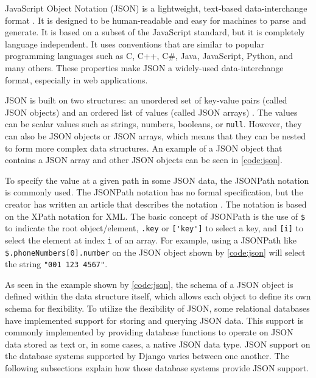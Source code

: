 JavaScript Object Notation (JSON) is a lightweight, text-based data-interchange
format \cite{json}. It is designed to be human-readable and easy for machines
to parse and generate. It is based on a subset of the JavaScript standard, but
it is completely language independent. It uses conventions that are similar to
popular programming languages such as C, C++, C\#, Java, JavaScript, Python,
and many others. These properties make JSON a widely-used data-interchange
format, especially in web applications.

\noindent
\begin{minipage}{\linewidth}

\end{minipage}

JSON is built on two structures: an unordered set of key-value pairs (called
JSON objects) and an ordered list of values (called JSON arrays)
\cite{json:org}. The values can be scalar values such as strings, numbers,
booleans, or \verb|null|. However, they can also be JSON objects or JSON
arrays, which means that they can be nested to form more complex data
structures. An example of a JSON object that contains a JSON array and other
JSON objects can be seen in \autoref{code:json}.

To specify the value at a given path in some JSON data, the JSONPath notation
is commonly used. The JSONPath notation has no formal specification, but the
creator has written an article that describes the notation
\cite{goessner:jsonpath}. The notation is based on the XPath notation for XML.
The basic concept of JSONPath is the use of \verb|$| to indicate the root
object/element, \verb|.key| or \verb|['key']| to select a key, and \verb|[i]|
to select the element at index \verb|i| of an array. For example, using a
JSONPath like \verb|$.phoneNumbers[0].number| on the JSON object shown by
\autoref{code:json} will select the string \verb|"001 123 4567"|.

As seen in the example shown by \autoref{code:json}, the schema of a JSON
object is defined within the data structure itself, which allows each object to
define its own schema for flexibility. To utilize the flexibility of JSON, some
relational databases have implemented support for storing and querying JSON
data. This support is commonly implemented by providing database functions to
operate on JSON data stored as text or, in some cases, a native JSON data type.
JSON support on the database systems supported by Django varies between one
another. The following subsections explain how those database systems provide
JSON support.

